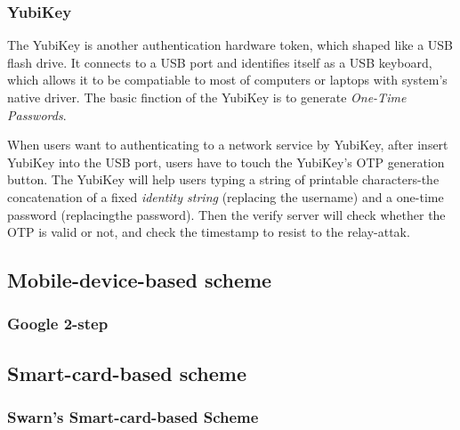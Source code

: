 \begin{CJK}{Bg5}{bsmi}
\subsubsection{YubiKey}

The YubiKey is another authentication hardware token, which shaped like a USB flash drive. It connects to a USB port and identifies itself as a USB keyboard, which allows it to be compatiable to most of computers or laptops with system's native driver. The basic finction of the YubiKey is to generate \emph{One-Time Passwords}. 

When users want to authenticating to a network service by YubiKey, after insert YubiKey into the USB port, users have to touch the YubiKey's OTP generation button. The YubiKey will help users typing a string of printable characters-the concatenation of a fixed \emph{identity string} (replacing the username) and a one-time password (replacingthe password). Then the verify server will check whether the OTP is valid or not, and check the timestamp to resist to the relay-attak.

\subsection{Mobile-device-based scheme}

\subsubsection{Google 2-step}

\subsection{Smart-card-based scheme}

\subsubsection{Swarn's Smart-card-based Scheme}

\end{CJK}